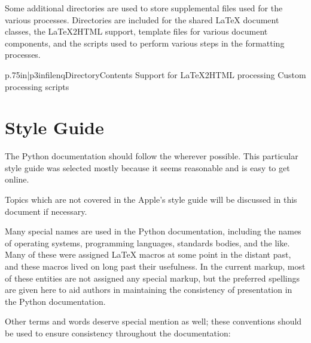 \documentclass{howto}
\begin{document}
\begin{definitions}
        Some additional directories are used to store supplemental
        files used for the various processes.  Directories are
        included for the shared \LaTeX{} document classes, the
        \LaTeX2HTML support, template files for various document
        components, and the scripts used to perform various steps in
        the formatting processes.

        \begin{tableii}{p{.75in}|p{3in}}{filenq}{Directory}{Contents}
               {Support for \LaTeX2HTML processing}
              {Custom processing scripts}
        \end{tableii}

  \end{definitions}


\section{Style Guide \label{style-guide}}

  The Python documentation should follow the  wherever possible.  This particular
  style guide was selected mostly because it seems reasonable and is
  easy to get online.

  Topics which are not covered in the Apple's style guide will be
  discussed in this document if necessary.

  Many special names are used in the Python documentation, including
  the names of operating systems, programming languages, standards
  bodies, and the like.  Many of these were assigned \LaTeX{} macros
  at some point in the distant past, and these macros lived on long
  past their usefulness.  In the current markup, most of these entities
  are not assigned any special markup, but the preferred spellings are
  given here to aid authors in maintaining the consistency of
  presentation in the Python documentation.

  Other terms and words deserve special mention as well; these conventions
  should be used to ensure consistency throughout the documentation:
\end{document}
